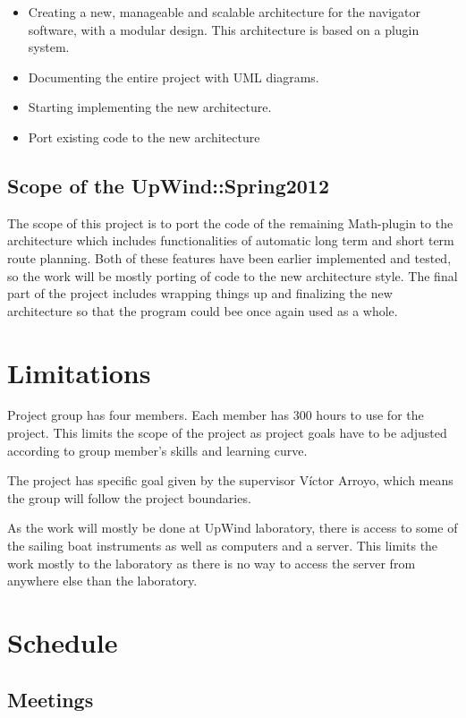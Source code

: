 \documentclass[12pt,titlepage,a4paper]{article}
\begin{document}
		\begin{itemize}
			\item Creating a new, manageable and scalable architecture for the navigator software, with a modular design.
				This architecture is based on a plugin system.
			\item Documenting the entire project with UML diagrams.
			\item Starting implementing the new architecture.
			\item Port existing code to the new architecture
		\end{itemize}
 
	\subsection{Scope of the UpWind::Spring2012}
	
	The scope of this project is to port the code of the remaining Math-plugin to the architecture which includes functionalities of automatic long term and short term route planning. Both of these features have been earlier implemented and tested, so the work will be mostly porting of code to the new architecture style. The final part of the project includes wrapping things up and finalizing the new architecture so that the program could bee once again used as a whole.

\section{Limitations}
	Project group has four members. Each member has 300 hours to use for the project. This limits the scope of the project as 		project goals have to be adjusted according to group member's skills and learning curve.
	
	The project has specific goal given by the supervisor Víctor Arroyo, which means the group will follow the project 			boundaries.

	As the work will mostly be done at UpWind laboratory, there is access to some of the sailing boat instruments as well as 		computers and a server. This limits the work mostly to the laboratory as there is no way to access the server from anywhere 		else than the laboratory.

\section{Schedule}
 
	\subsection{Meetings}
\end{document}
